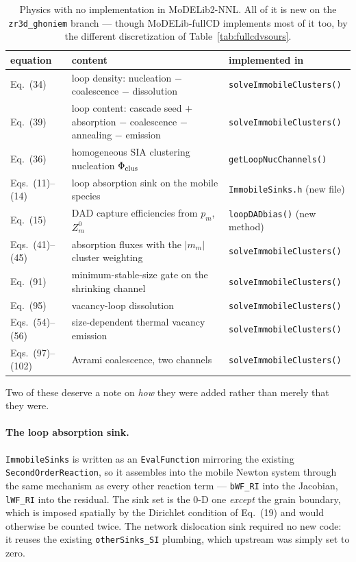 \documentclass[11pt]{article}
\newcommand{\MoDfull}{\textsf{MoDELib-fullCD}}
\newcommand{\MoDnnl}{\textsf{MoDELib2-NNL}}
\newcommand{\code}[1]{\texttt{\small #1}}
\newcommand{\file}[1]{\texttt{\footnotesize #1}}
\newcommand{\dref}[1]{Eq.~(#1)}
\newcommand{\drefs}[2]{Eqs.~(#1)--(#2)}
\begin{document}
\begin{table}[htbp]
\centering
\caption{Physics with no implementation in \MoDnnl{}. All of it is new on the
\file{zr3d\_ghoniem} branch --- though \MoDfull{} implements most of it too, by
the different discretization of Table~\ref{tab:fullcdvsours}.}
\label{tab:eqadded}
\begin{tabular}{@{}llp{}@{}}
\toprule
equation & content & implemented in \\
\midrule
\dref{34} & loop density: nucleation $-$ coalescence $-$ dissolution &
  \code{solveImmobileClusters()} \\
\dref{39} & loop content: cascade seed $+$ absorption $-$ coalescence
  $-$ annealing $-$ emission & \code{solveImmobileClusters()} \\
\dref{36} & homogeneous SIA clustering nucleation $\Phi_{\rm clus}$ &
  \code{getLoopNucChannels()} \\
\drefs{11}{14} & loop absorption sink on the mobile species &
  \code{ImmobileSinks.h} (new file) \\
\dref{15} & DAD capture efficiencies from $p_m$, $Z^0_m$ &
  \code{loopDADbias()} (new method) \\
\drefs{41}{45} & absorption fluxes with the $|m_m|$ cluster weighting &
  \code{solveImmobileClusters()} \\
\dref{91} & minimum-stable-size gate on the shrinking channel &
  \code{solveImmobileClusters()} \\
\dref{95} & vacancy-loop dissolution &
  \code{solveImmobileClusters()} \\
\drefs{54}{56} & size-dependent thermal vacancy emission &
  \code{solveImmobileClusters()} \\
\drefs{97}{102} & Avrami coalescence, two channels &
  \code{solveImmobileClusters()} \\
\bottomrule
\end{tabular}
\end{table}

\noindent
Two of these deserve a note on \emph{how} they were added rather than merely
that they were.

\paragraph*{The loop absorption sink.} \code{ImmobileSinks} is written as an
\code{EvalFunction} mirroring the existing \code{SecondOrderReaction}, so it
assembles into the mobile Newton system through the same mechanism as every
other reaction term --- \code{bWF\_RI} into the Jacobian, \code{lWF\_RI} into the
residual. The sink set is the 0-D one \emph{except} the grain boundary, which is
imposed spatially by the Dirichlet condition of \dref{19} and would otherwise be
counted twice. The network dislocation sink required no new code: it reuses the
existing \code{otherSinks\_SI} plumbing, which upstream was simply set to zero.
\end{document}
